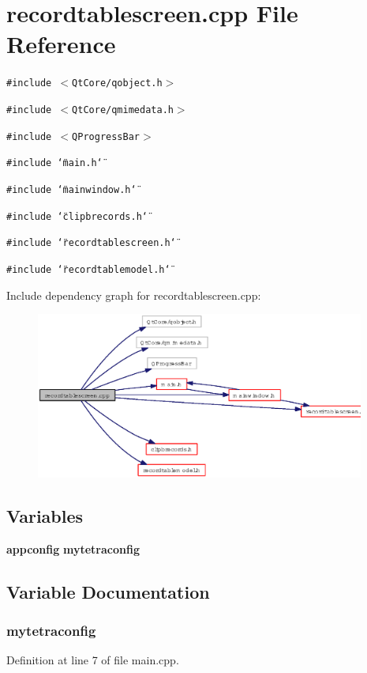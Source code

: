 \section{recordtablescreen.cpp File Reference}
\label{recordtablescreen_8cpp}
{\tt \#include $<$Qt\-Core/qobject.h$>$}\par
{\tt \#include $<$Qt\-Core/qmimedata.h$>$}\par
{\tt \#include $<$QProgress\-Bar$>$}\par
{\tt \#include \char`\"{}main.h\char`\"{}}\par
{\tt \#include \char`\"{}mainwindow.h\char`\"{}}\par
{\tt \#include \char`\"{}clipbrecords.h\char`\"{}}\par
{\tt \#include \char`\"{}recordtablescreen.h\char`\"{}}\par
{\tt \#include \char`\"{}recordtablemodel.h\char`\"{}}\par


Include dependency graph for recordtablescreen.cpp:\begin{figure}[H]
\begin{center}
\leavevmode
\includegraphics[width=307pt]{recordtablescreen_8cpp__incl}
\end{center}
\end{figure}
\subsection*{Variables}
\begin{CompactItemize}
\item 
{\bf appconfig} {\bf mytetraconfig}
\end{CompactItemize}


\subsection{Variable Documentation}
\subsubsection{ {\bf mytetraconfig}}\label{recordtablescreen_8cpp_69bd0a7d678d494effdef51808501712}




Definition at line 7 of file main.cpp.